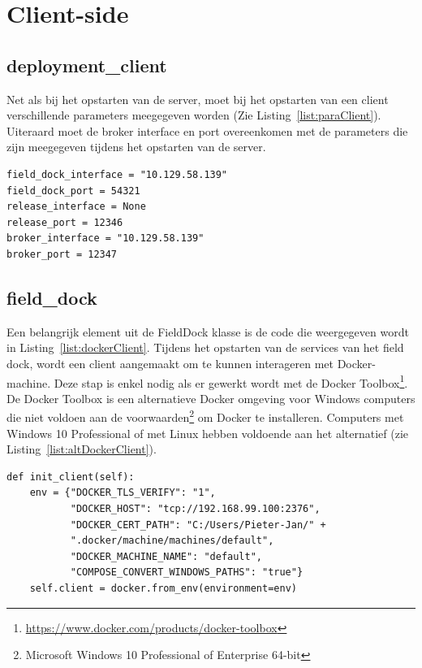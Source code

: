 \section{Client-side}
\subsection{deployment\_client}
Net als bij het opstarten van de server, moet bij het opstarten van een client verschillende parameters meegegeven worden (Zie Listing~\ref{list:paraClient}).
Uiteraard moet de broker interface en port overeenkomen met de parameters die zijn meegegeven tijdens het opstarten van de server.

\begin{minipage}{\linewidth}
\begin{center}
\begin{lstlisting}[caption={Parameters voor een client},label={list:paraClient}]
field_dock_interface = "10.129.58.139"
field_dock_port = 54321
release_interface = None
release_port = 12346
broker_interface = "10.129.58.139"
broker_port = 12347
\end{lstlisting}
\end{center}
\end{minipage}

\subsection{field\_dock}
Een belangrijk element uit de FieldDock klasse is de code die weergegeven wordt in Listing~\ref{list:dockerClient}.
Tijdens het opstarten van de services van het field dock, wordt een client aangemaakt om te kunnen interageren met Docker-machine.
Deze stap is enkel nodig als er gewerkt wordt met de Docker Toolbox\footnote{\url{https://www.docker.com/products/docker-toolbox}}.
De Docker Toolbox is een alternatieve Docker omgeving voor Windows computers die niet voldoen aan de voorwaarden\footnote{Microsoft Windows 10 Professional of Enterprise 64-bit} om Docker te installeren.
Computers met Windows 10 Professional of met Linux hebben voldoende aan het alternatief (zie Listing~\ref{list:altDockerClient}).

\begin{minipage}{\linewidth}
\begin{center}
\begin{lstlisting}[caption={Parameters voor de Docker client},label={list:dockerClient}]
def init_client(self):
    env = {"DOCKER_TLS_VERIFY": "1",
           "DOCKER_HOST": "tcp://192.168.99.100:2376",
           "DOCKER_CERT_PATH": "C:/Users/Pieter-Jan/" +
           ".docker/machine/machines/default",
           "DOCKER_MACHINE_NAME": "default",
           "COMPOSE_CONVERT_WINDOWS_PATHS": "true"}
    self.client = docker.from_env(environment=env)
\end{lstlisting}
\end{center}
\end{minipage}

